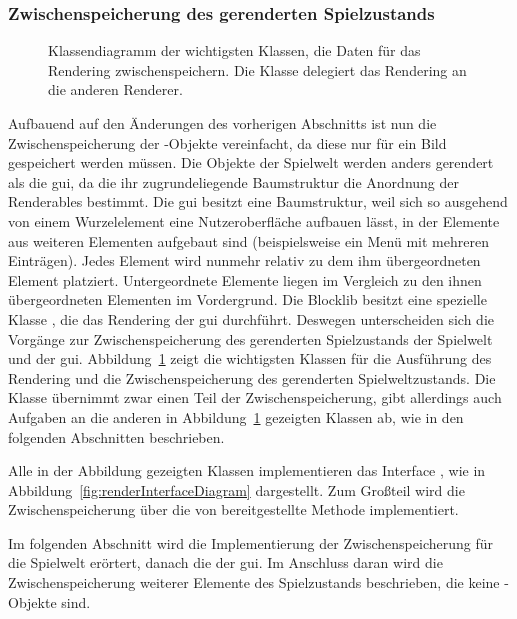 \subsubsection{Zwischenspeicherung des gerenderten Spielzustands}\label{sec:saveRenderState}
\begin{figure}
	\centering
	
	\caption[Klassendiagramm der wichtigsten Klassen, die Daten für das Rendering zwischenspeichern.]{Klassendiagramm der wichtigsten Klassen, die Daten für das Rendering zwischenspeichern. Die Klasse \classMasterRenderer{} delegiert das Rendering an die anderen Renderer.}\label{fig:renderDiagram}
\end{figure}
Aufbauend auf den Änderungen des vorherigen Abschnitts ist nun die Zwischenspeicherung der \classRenderable{}-Objekte vereinfacht, da diese nur für ein Bild gespeichert werden müssen. Die Objekte der Spielwelt werden anders gerendert als die \ac{gui}, da die ihr zugrundeliegende Baumstruktur die Anordnung der Renderables bestimmt. Die \ac{gui} besitzt eine Baumstruktur, weil sich so ausgehend von einem Wurzelelement eine Nutzeroberfläche aufbauen lässt, in der Elemente aus weiteren Elementen aufgebaut sind (beispielsweise ein Menü mit mehreren Einträgen). Jedes Element wird nunmehr relativ zu dem ihm übergeordneten Element platziert. Untergeordnete Elemente liegen im Vergleich zu den ihnen übergeordneten Elementen im Vordergrund. Die Blocklib besitzt eine spezielle Klasse \classUIRenderer{}, die das Rendering der \ac{gui} durchführt. Deswegen unterscheiden sich die Vorgänge zur Zwischenspeicherung des gerenderten Spielzustands der Spielwelt und der \ac{gui}. Abbildung~\ref{fig:renderDiagram} zeigt die wichtigsten Klassen für die Ausführung des Rendering und die Zwischenspeicherung des gerenderten Spielweltzustands. Die Klasse \classMasterRenderer{} übernimmt zwar einen Teil der Zwischenspeicherung, gibt allerdings auch Aufgaben an die anderen in Abbildung~\ref{fig:renderDiagram} gezeigten Klassen ab, wie in den folgenden Abschnitten beschrieben.

Alle in der Abbildung gezeigten Klassen implementieren das Interface \classDoubleBuffer{}, wie in Abbildung~\ref{fig:renderInterfaceDiagram} dargestellt. Zum Großteil wird die Zwischenspeicherung über die von \classDoubleBuffer{} bereitgestellte Methode  implementiert.

Im folgenden Abschnitt wird die Implementierung der Zwischenspeicherung für die Spielwelt erörtert, danach die der \ac{gui}. Im Anschluss daran wird die Zwischenspeicherung weiterer Elemente des Spielzustands beschrieben, die keine \classRenderable{}-Objekte sind.

